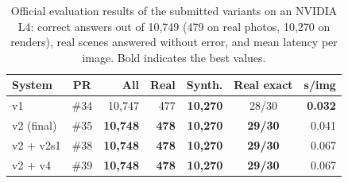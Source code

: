 \begin{table}[t]
\caption{Official evaluation results of the submitted variants on an NVIDIA L4: correct answers out of 10{,}749 (479 on real photos, 10{,}270 on renders), real scenes answered without error, and mean latency per image. Bold indicates the best values.}
\label{tab:official}
\small
\begin{tabular}{@{}lcrrrcr@{}}
\toprule
System & PR & All & Real & Synth. & Real exact & s/img \\
\midrule
v1 & \#34 & 10{,}747 & 477 & \textbf{10{,}270} & 28/30 & \textbf{0.032} \\
v2 (final) & \#35 & \textbf{10{,}748} & \textbf{478} & \textbf{10{,}270} & \textbf{29/30} & 0.041 \\
v2 + v2s1 & \#38 & \textbf{10{,}748} & \textbf{478} & \textbf{10{,}270} & \textbf{29/30} & 0.067 \\
v2 + v4 & \#39 & \textbf{10{,}748} & \textbf{478} & \textbf{10{,}270} & \textbf{29/30} & 0.067 \\
\bottomrule
\end{tabular}
\end{table}
